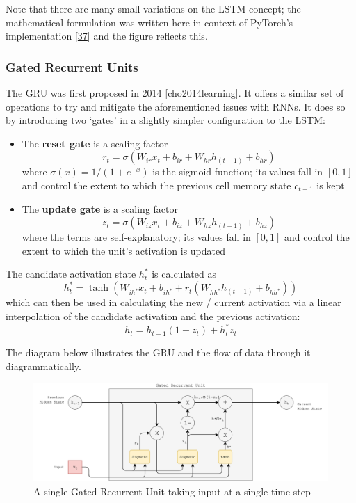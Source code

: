 \documentclass[12pt,]{article}
\providecommand{\tightlist}{%
  \setlength{\itemsep}{0pt}\setlength{\parskip}{0pt}}
\begin{document}
Note that there are many small variations on the LSTM concept; the
mathematical formulation was written here in context of PyTorch's
implementation {[}\protect\hyperlink{ref-pytorchlstm}{37}{]} and the
figure reflects this.

\hypertarget{gated-recurrent-units}{%
\subsubsection{Gated Recurrent Units}\label{gated-recurrent-units}}

The GRU was first proposed in 2014 {[}cho2014learning{]}. It offers a
similar set of operations to try and mitigate the aforementioned issues
with RNNs. It does so by introducing two `gates' in a slightly simpler
configuration to the LSTM:

\begin{itemize}
\tightlist
\item
  The \textbf{reset gate} is a scaling factor
  \[r_t = \sigma(W_{ir} x_t + b_{ir} + W_{hr} h_{(t-1)} + b_{hr})\]
  where \(\sigma(x) = 1 / (1 + e^{-x})\) is the sigmoid function; its
  values fall in \([0,1]\) and control the extent to which the previous
  cell memory state \(c_{t-1}\) is kept
\item
  The \textbf{update gate} is a scaling factor
  \[z_t = \sigma(W_{iz} x_t + b_{iz} + W_{hz} h_{(t-1)} + b_{hz})\]
  where the terms are self-explanatory; its values fall in \([0,1]\) and
  control the extent to which the unit's activation is updated
\end{itemize}

The candidate activation state \(h_t^*\) is calculated as
\[h_t^* = \tanh(W_{ih^*} x_t + b_{ih^*} + r_t (W_{hh^*} h_{(t-1)} + b_{hh^*}))\]
which can then be used in calculating the new / current activation via a
linear interpolation of the candidate activation and the previous
activation: \[h_t = h_{t-1} (1 - z_t) + h_t^* z_t\]

The diagram below illustrates the GRU and the flow of data through it
diagrammatically.

\begin{figure}
\centering
\includegraphics{Images/gru.png}
\caption{A single Gated Recurrent Unit taking input at a single time
step}
\end{figure}
\end{document}
